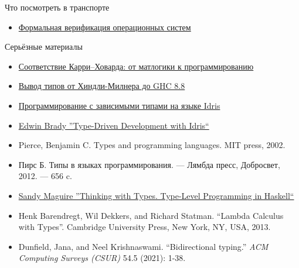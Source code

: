 
    \begin{frame}{Что посмотреть в транспорте}
        \begin{itemize}
            \item \href{https://youtu.be/f12hIDF0XPc}{\color{blue} Формальная верификация операционных систем}
        \end{itemize}
    \end{frame}

    \begin{frame}{Серьёзные материалы}
        \begin{itemize}
            \item \href{https://www.mccme.ru/dubna/2017/courses/bragilevsky.html}{\color{blue} Соответствие Карри–Ховарда: от матлогики к программированию}
            \item \href{https://www.youtube.com/watch?v=_HYI7zjkrEs&list=PLvPsfYrGz3wuVAGhNf6-i7uafXg56oqM5}{\color{blue} Вывод типов от Хиндли-Милнера до GHC 8.8}
            \item \href{https://youtu.be/o-7zhrUP3ds}{\color{blue} Программирование с зависимыми типами на языке Idris}
            \item \href{https://www.amazon.com/Type-driven-Development-Idris-Edwin-Brady/dp/1617293024}{\color{blue} Edwin Brady ''Type-Driven Development with Idris``}
            \item Pierce, Benjamin C. Types and programming languages. MIT press, 2002.
            \item Пирс Б. Типы в языках программирования. — Лямбда пресс, Добросвет, 2012. — 656 c.
            \item \href{https://thinkingwithtypes.com/}{\color{blue} Sandy Maguire ''Thinking with Types. Type-Level Programming in Haskell``}
            \item Henk Barendregt, Wil Dekkers, and Richard Statman. ``Lambda Calculus with Types''. Cambridge University Press, New York, NY, USA, 2013.
            \item Dunfield, Jana, and Neel Krishnaswami. ``Bidirectional typing.'' \textit{ACM Computing Surveys (CSUR)} 54.5 (2021): 1-38.
        \end{itemize}
    \end{frame}


